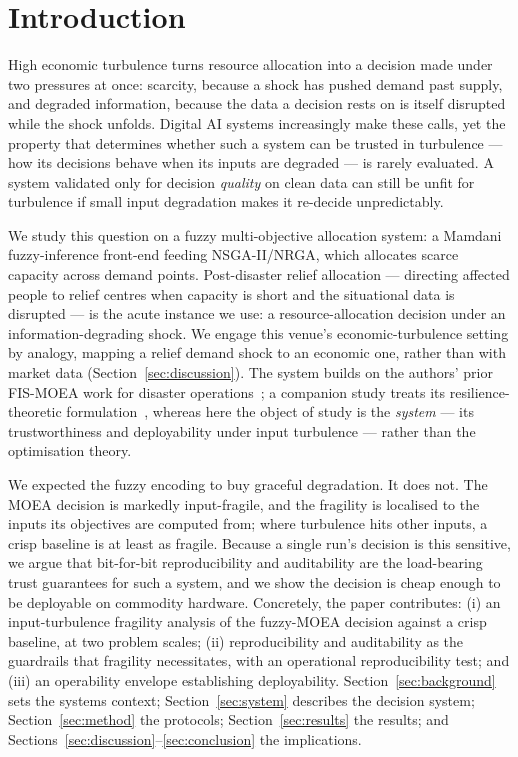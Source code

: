 \documentclass[systems,article,submit,moreauthors,pdftex]{Definitions/mdpi}
\begin{document}
\section{Introduction}\label{sec:intro}

High economic turbulence turns resource allocation into a decision made under two pressures at
once: scarcity, because a shock has pushed demand past supply, and degraded information,
because the data a decision rests on is itself disrupted while the shock unfolds. Digital AI
systems increasingly make these calls, yet the property that determines whether such a system
can be trusted in turbulence --- how its decisions behave when its inputs are degraded --- is
rarely evaluated. A system validated only for decision \emph{quality} on clean data can still
be unfit for turbulence if small input degradation makes it re-decide unpredictably.

We study this question on a fuzzy multi-objective allocation system: a Mamdani
fuzzy-inference front-end feeding NSGA-II/NRGA, which allocates scarce capacity across demand
points. Post-disaster relief allocation --- directing affected people to relief centres when
capacity is short and the situational data is disrupted --- is the acute instance we use: a
resource-allocation decision under an information-degrading shock. We engage this venue's
economic-turbulence setting by analogy, mapping a relief demand shock to an economic one,
rather than with market data (Section~\ref{sec:discussion}). The system builds on the
authors' prior FIS-MOEA work for disaster operations~\cite{rabiei2021,rabiei2023}; a companion
study treats its resilience-theoretic formulation~\cite{paperA2026}, whereas here the object of
study is the \emph{system} --- its trustworthiness and deployability under input turbulence ---
rather than the optimisation theory.

We expected the fuzzy encoding to buy graceful degradation. It does not. The MOEA decision is
markedly input-fragile, and the fragility is localised to the inputs its objectives are
computed from; where turbulence hits other inputs, a crisp baseline is at least as fragile.
Because a single run's decision is this sensitive, we argue that bit-for-bit reproducibility
and auditability are the load-bearing trust guarantees for such a system, and we show the
decision is cheap enough to be deployable on commodity hardware. Concretely, the paper
contributes: (i) an input-turbulence fragility analysis of the fuzzy-MOEA decision against a
crisp baseline, at two problem scales; (ii) reproducibility and auditability as the guardrails
that fragility necessitates, with an operational reproducibility test; and (iii) an operability
envelope establishing deployability. Section~\ref{sec:background} sets the systems context;
Section~\ref{sec:system} describes the decision system; Section~\ref{sec:method} the protocols;
Section~\ref{sec:results} the results; and Sections~\ref{sec:discussion}--\ref{sec:conclusion}
the implications.
\end{document}
